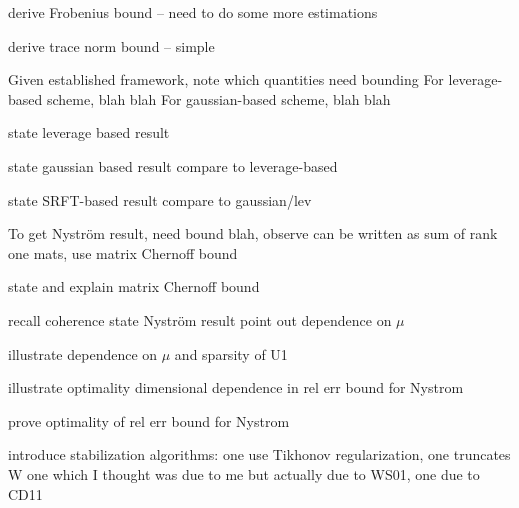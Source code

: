 \documentclass[xcolor={svgnames,pdftex,dvipsnames,table},10pt]{beamer} %
\begin{document}
\begin{frame}
 derive Frobenius bound -- need to do some more estimations
\end{frame}

\begin{frame}
 derive trace norm bound -- simple
\end{frame}

\begin{frame}
 Given established framework, note which quantities need bounding
 For leverage-based scheme, blah blah
 For gaussian-based scheme, blah blah
\end{frame}

\begin{frame}
state leverage based result
\end{frame}

\begin{frame}
 state gaussian based result
 compare to leverage-based
\end{frame}

\begin{frame}
 state SRFT-based result
 compare to gaussian/lev
\end{frame}

\begin{frame}
To get Nystr\"om result, need bound blah, observe
can be written as sum of rank one mats,
use matrix Chernoff bound
\end{frame}

\begin{frame}
 state and explain matrix Chernoff bound
\end{frame}

\begin{frame}
recall coherence
 state Nystr\"om result
 point out dependence on $\mu$
\end{frame}

\begin{frame}
 illustrate dependence on $\mu$ and sparsity of U1
\end{frame}

\begin{frame}
 illustrate optimality dimensional dependence in rel err bound for Nystrom
\end{frame}

\begin{frame}
 prove optimality of rel err bound for Nystrom
\end{frame}

\begin{frame}
 introduce stabilization algorithms:
 one use Tikhonov regularization, one truncates W
 one which I thought was due to me but actually due to WS01, one due to CD11
\end{frame}
\end{document}
